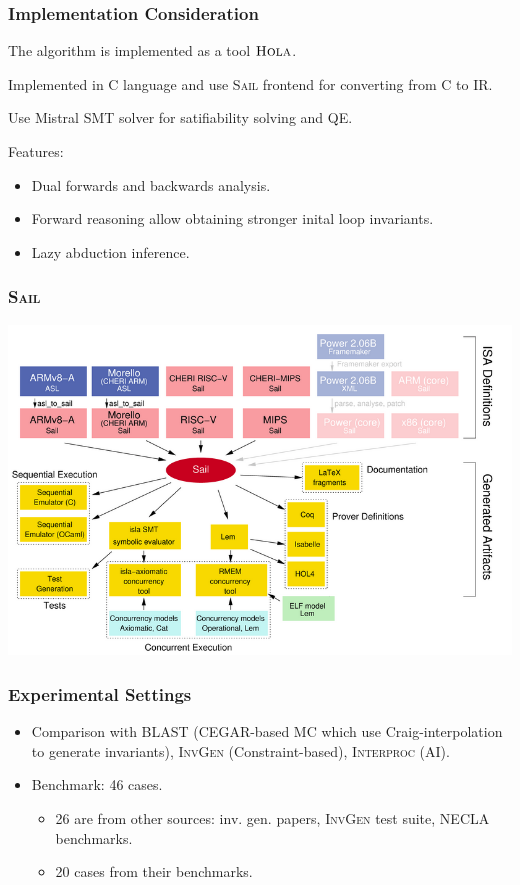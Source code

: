 \documentclass[11pt]{beamer}
\begin{document}
\begin{frame}\frametitle{Implementation Consideration}
The algorithm is implemented as a tool $\textsc{Hola}$.

Implemented in C language and use \textsc{Sail} frontend for converting from C to IR. 

Use Mistral SMT solver for satifiability solving and QE.

Features:
\begin{itemize}
\item Dual forwards and backwards analysis. 

\item Forward reasoning allow obtaining stronger inital loop invariants. 

\item Lazy abduction inference.

\end{itemize}
\end{frame}


\begin{frame}\frametitle{\textsc{Sail}}


\begin{center}
\includegraphics[scale=0.4]{sail.png}
\end{center}
\end{frame}

\begin{frame}\frametitle{Experimental Settings}
\begin{itemize}

\item Comparison with \textsc{BLAST} (CEGAR-based MC which use Craig-interpolation to generate invariants), \textsc{InvGen }(Constraint-based), \textsc{Interproc} (AI).


\item Benchmark: 46 cases.
\begin{itemize}
\item 26 are from other sources: inv. gen. papers, \textsc{InvGen} test suite, \textsc{NECLA} benchmarks.

\item 20 cases from their benchmarks.
\end{itemize}


\end{itemize}
\end{frame}
\end{document}
